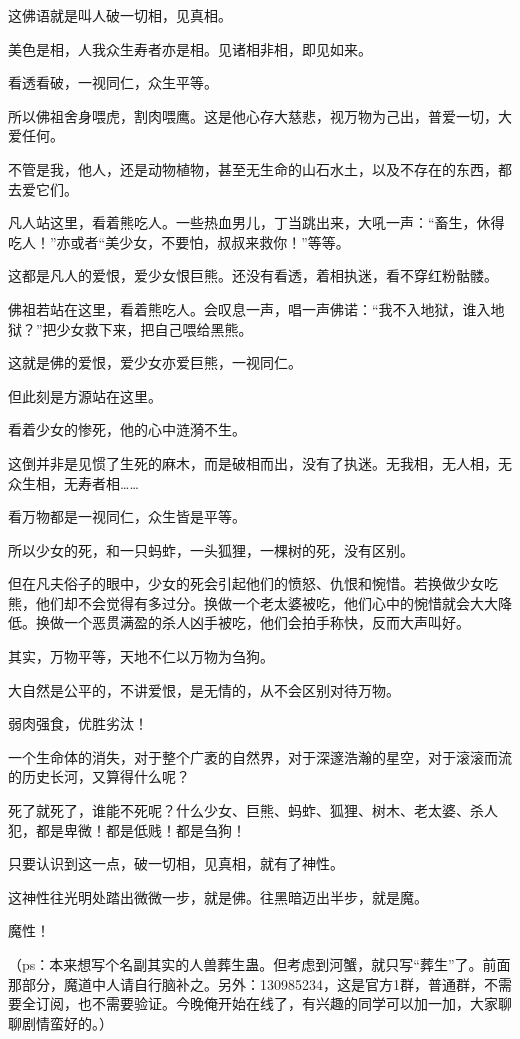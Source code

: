 \begin{this_body}
这佛语就是叫人破一切相，见真相。

美色是相，人我众生寿者亦是相。见诸相非相，即见如来。

看透看破，一视同仁，众生平等。

所以佛祖舍身喂虎，割肉喂鹰。这是他心存大慈悲，视万物为己出，普爱一切，大爱任何。

不管是我，他人，还是动物植物，甚至无生命的山石水土，以及不存在的东西，都去爱它们。

凡人站这里，看着熊吃人。一些热血男儿，丁当跳出来，大吼一声：“畜生，休得吃人！”亦或者“美少女，不要怕，叔叔来救你！”等等。

这都是凡人的爱恨，爱少女恨巨熊。还没有看透，着相执迷，看不穿红粉骷髅。

佛祖若站在这里，看着熊吃人。会叹息一声，唱一声佛诺：“我不入地狱，谁入地狱？”把少女救下来，把自己喂给黑熊。

这就是佛的爱恨，爱少女亦爱巨熊，一视同仁。

但此刻是方源站在这里。

看着少女的惨死，他的心中涟漪不生。

这倒并非是见惯了生死的麻木，而是破相而出，没有了执迷。无我相，无人相，无众生相，无寿者相……

看万物都是一视同仁，众生皆是平等。

所以少女的死，和一只蚂蚱，一头狐狸，一棵树的死，没有区别。

但在凡夫俗子的眼中，少女的死会引起他们的愤怒、仇恨和惋惜。若换做少女吃熊，他们却不会觉得有多过分。换做一个老太婆被吃，他们心中的惋惜就会大大降低。换做一个恶贯满盈的杀人凶手被吃，他们会拍手称快，反而大声叫好。

其实，万物平等，天地不仁以万物为刍狗。

大自然是公平的，不讲爱恨，是无情的，从不会区别对待万物。

弱肉强食，优胜劣汰！

一个生命体的消失，对于整个广袤的自然界，对于深邃浩瀚的星空，对于滚滚而流的历史长河，又算得什么呢？

死了就死了，谁能不死呢？什么少女、巨熊、蚂蚱、狐狸、树木、老太婆、杀人犯，都是卑微！都是低贱！都是刍狗！

只要认识到这一点，破一切相，见真相，就有了神性。

这神性往光明处踏出微微一步，就是佛。往黑暗迈出半步，就是魔。

魔性！

（ps：本来想写个名副其实的人兽葬生蛊。但考虑到河蟹，就只写“葬生”了。前面那部分，魔道中人请自行脑补之。另外：130985234，这是官方1群，普通群，不需要全订阅，也不需要验证。今晚俺开始在线了，有兴趣的同学可以加一加，大家聊聊剧情蛮好的。）

\end{this_body}

